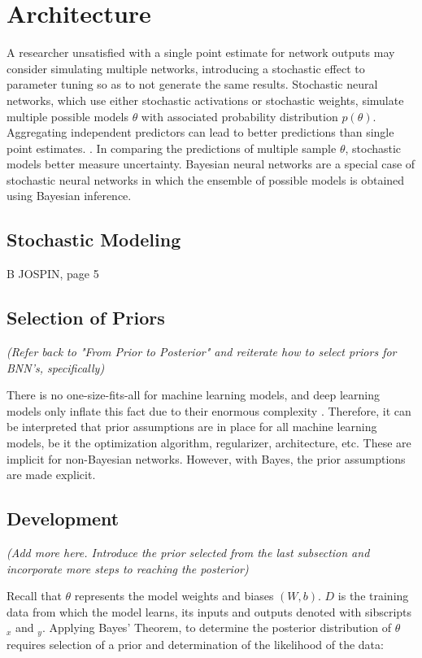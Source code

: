 \section{Architecture}

A researcher unsatisfied with a single point estimate for network outputs may consider simulating multiple networks, introducing a stochastic effect to parameter tuning so as to not generate the same results. Stochastic neural networks, which use either stochastic activations or stochastic weights, simulate multiple possible models $\theta$ with associated probability distribution $p(\theta)$.  Aggregating independent predictors can lead to better predictions than single point estimates. \cite{Jospin}.  In comparing the predictions of multiple sample $\theta$, stochastic models better measure uncertainty.  Bayesian neural networks are a special case of stochastic neural networks in which the ensemble of possible models is obtained using Bayesian inference. \cite{mackay1992practical}

\subsection{Stochastic Modeling} B
JOSPIN, page 5

\subsection{Selection of Priors}

\textit{(Refer back to "From Prior to Posterior" and reiterate how to select priors for BNN's, specifically)}

There is no one-size-fits-all for machine learning models, and deep learning models only inflate this fact due to their enormous complexity \cite{Goodfellow-et-al-2016}.  Therefore, it can be interpreted \cite{Jospin} that prior assumptions are in place for all machine learning models, be it the optimization algorithm, regularizer, architecture, etc. These are implicit for non-Bayesian networks.  However, with Bayes, the prior assumptions are made explicit.

\subsection{Development}

\textit{(Add more here.  Introduce the prior selected from the last subsection and incorporate more steps to reaching the posterior)}

Recall that $\theta$ represents the model weights and biases $(W,b)$.  $D$ is the training data from which the model learns, its inputs and outputs denoted with sibscripts $_x$ and $_y$.  Applying Bayes' Theorem, to determine the posterior distribution of $\theta$ requires selection of a prior and determination of the likelihood of the data:

